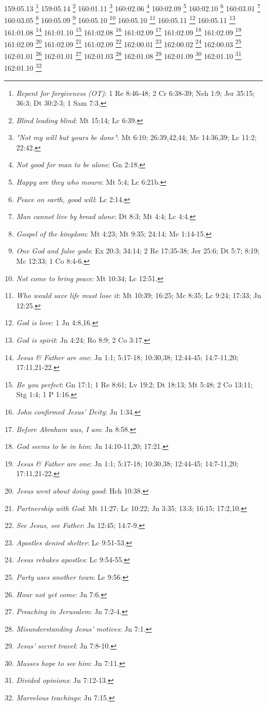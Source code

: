 159:05.13 \footnote{\textit{Repent for forgiveness (OT)}: 1 Re 8:46-48; 2 Cr 6:38-39; Neh 1:9; Jer 35:15; 36:3; Dt 30:2-3; 1 Sam 7:3.}
159:05.14 \footnote{\textit{Blind leading blind}: Mt 15:14; Lc 6:39.}
160:01.11 \footnote{\textit{"Not my will but yours be done"}: Mt 6:10; 26:39,42,44; Mc 14:36,39; Lc 11:2; 22:42.}
160:02.06 \footnote{\textit{Not good for man to be alone}: Gn 2:18.}
160:02.09 \footnote{\textit{Happy are they who mourn}: Mt 5:4; Lc 6:21b.}
160:02.10 \footnote{\textit{Peace on earth, good will}: Lc 2:14.}
160:03.01 \footnote{\textit{Man cannot live by bread alone}: Dt 8:3; Mt 4:4; Lc 4:4.}
160:03.05 \footnote{\textit{Gospel of the kingdom}: Mt 4:23; Mt 9:35; 24:14; Mc 1:14-15.}
160:05.09 \footnote{\textit{One God and false gods}: Ex 20:3; 34:14; 2 Re 17:35-38; Jer 25:6; Dt 5:7; 8:19; Mc 12:33; 1 Co 8:4-6.}
160:05.10 \footnote{\textit{Not come to bring peace}: Mt 10:34; Lc 12:51.}
160:05.10 \footnote{\textit{Who would save life must lose it}: Mt 10:39; 16:25; Mc 8:35; Lc 9:24; 17:33; Jn 12:25.}
160:05.11 \footnote{\textit{God is love}: 1 Jn 4:8,16.}
160:05.11 \footnote{\textit{God is spirit}: Jn 4:24; Ro 8:9; 2 Co 3:17.}
161:01.08 \footnote{\textit{Jesus & Father are one}: Jn 1:1; 5:17-18; 10:30,38; 12:44-45; 14:7-11,20; 17:11,21-22.}
161:01.10 \footnote{\textit{Be you perfect}: Gn 17:1; 1 Re 8:61; Lv 19:2; Dt 18:13; Mt 5:48; 2 Co 13:11; Stg 1:4; 1 P 1:16.}
161:02.08 \footnote{\textit{John confirmed Jesus' Deity}: Jn 1:34.}
161:02.09 \footnote{\textit{Before Abraham was, I am}: Jn 8:58.}
161:02.09 \footnote{\textit{God seems to be in him}: Jn 14:10-11,20; 17:21.}
161:02.09 \footnote{\textit{Jesus & Father are one}: Jn 1:1; 5:17-18; 10:30,38; 12:44-45; 14:7-11,20; 17:11,21-22.}
161:02.09 \footnote{\textit{Jesus went about doing good}: Hch 10:38.}
161:02.09 \footnote{\textit{Partnership with God}: Mt 11:27; Lc 10:22; Jn 3:35; 13:3; 16:15; 17:2,10.}
161:02.09 \footnote{\textit{See Jesus, see Father}: Jn 12:45; 14:7-9.}
162:00.01 \footnote{\textit{Apostles denied shelter}: Lc 9:51-53.}
162:00.02 \footnote{\textit{Jesus rebukes apostles}: Lc 9:54-55.}
162:00.03 \footnote{\textit{Party uses another town}: Lc 9:56.}
162:01.01 \footnote{\textit{Hour not yet come}: Jn 7:6.}
162:01.01 \footnote{\textit{Preaching in Jerusalem}: Jn 7:2-4.}
162:01.03 \footnote{\textit{Misunderstanding Jesus' motives}: Jn 7:1.}
162:01.08 \footnote{\textit{Jesus' secret travel}: Jn 7:8-10.}
162:01.09 \footnote{\textit{Masses hope to see him}: Jn 7:11.}
162:01.10 \footnote{\textit{Divided opinions}: Jn 7:12-13.}
162:01.10 \footnote{\textit{Marvelous teachings}: Jn 7:15.}
